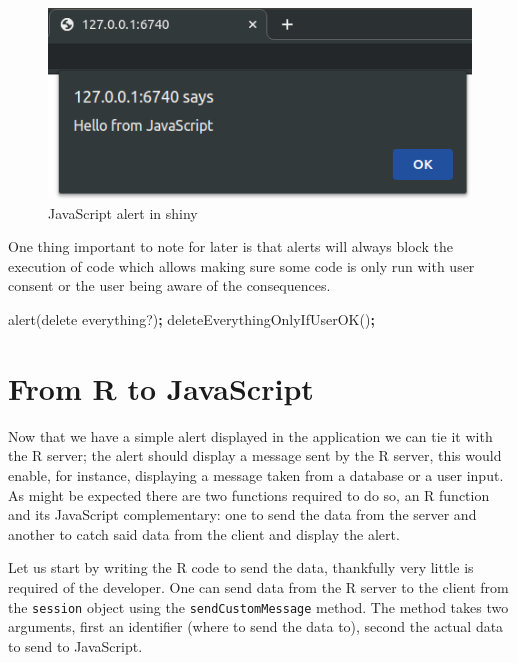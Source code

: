 \documentclass[
]{krantz}
\makeatletter
\newenvironment{Shaded}{\begin{snugshade}}{\end{snugshade}}
\newcommand{\AttributeTok}[1]{\textcolor[rgb]{0.61,0.61,0.61}{#1}}
\newcommand{\NormalTok}[1]{#1}
\newcommand{\OperatorTok}[1]{\textcolor[rgb]{0.43,0.43,0.43}{\textbf{#1}}}
\newcommand{\StringTok}[1]{\textcolor[rgb]{0.5,0.5,0.5}{#1}}
\newenvironment{kframe}{%
\medskip{}
\setlength{\fboxsep}{.8em}
 \def\at@end@of@kframe{}%
 \ifinner\ifhmode%
  \def\at@end@of@kframe{\end{minipage}}%
  \begin{minipage}{\columnwidth}%
 \fi\fi%
 \def\FrameCommand##1{\hskip\@totalleftmargin \hskip-\fboxsep
 \colorbox{shadecolor}{##1}\hskip-\fboxsep
     \hskip-\linewidth \hskip-\@totalleftmargin \hskip\columnwidth}%
 \MakeFramed {\advance\hsize-\width
   \@totalleftmargin\z@ \linewidth\hsize
   \@setminipage}}%
 {\par\unskip\endMakeFramed%
 \at@end@of@kframe}
\renewenvironment{Shaded}{\begin{kframe}}{\end{kframe}}
\makeatother
\begin{document}
\begin{figure}
\centering
\includegraphics{images/alert.png}
\caption{JavaScript alert in shiny}
\end{figure}

One thing important to note for later is that alerts will always block the execution of code which allows making sure some code is only run with user consent or the user being aware of the consequences.

\begin{Shaded}
\begin{Highlighting}[]
\AttributeTok{alert}\NormalTok{(}\StringTok{\textquotesingle{}delete everything?\textquotesingle{}}\NormalTok{)}\OperatorTok{;}
\AttributeTok{deleteEverythingOnlyIfUserOK}\NormalTok{()}\OperatorTok{;}
\end{Highlighting}
\end{Shaded}

\hypertarget{from-r-to-javascript}{%
\section{From R to JavaScript}\label{from-r-to-javascript}}

Now that we have a simple alert displayed in the application we can tie it with the R server; the alert should display a message sent by the R server, this would enable, for instance, displaying a message taken from a database or a user input. As might be expected there are two functions required to do so, an R function and its JavaScript complementary: one to send the data from the server and another to catch said data from the client and display the alert.

Let us start by writing the R code to send the data, thankfully very little is required of the developer. One can send data from the R server to the client from the \texttt{session} object using the \texttt{sendCustomMessage} method. The method takes two arguments, first an identifier (where to send the data to), second the actual data to send to JavaScript.
\end{document}

